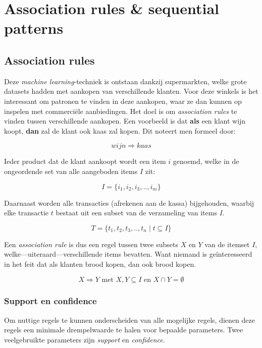 \chapter{Association rules \& sequential patterns}
%
\section{Association rules}
Deze \emph{machine learning}-techniek is ontstaan dankzij supermarkten, welke grote datasets hadden met aankopen van verschillende klanten. Voor deze winkels is het interessant om patronen te vinden in deze aankopen, waar ze dan kunnen op inspelen met commerci\"ele aanbiedingen. Het doel is om \emph{association rules} te vinden tussen verschillende aankopen. Een voorbeeld is dat \textbf{als} een klant wijn koopt, \textbf{dan} zal de klant ook kaas zal kopen. Dit noteert men formeel door:

\begin{equation}
wijn \Rightarrow kaas
\end{equation}

Ieder product dat de klant aankoopt wordt een item $i$ genoemd, welke in de ongeordende set van alle aangeboden items $I$ zit:

\begin{equation}
I = \{i_1, i_2, i_3, .., i_m\}
\end{equation}

Daarnaast worden alle transacties (afrekenen aan de kassa) bijgehouden, waarbij elke transactie $t$ bestaat uit een subset van de verzameling van items $I$.

\begin{equation}
T = \{t_1, t_2, t_3, .., t_n \mid t \subseteq I \}
\end{equation}

Een \emph{association rule} is dus een regel tussen twee subsets $X$ en $Y$ van de itemset $I$, welke---uiteraard---verschillende items bevatten. Want niemand is ge\"interesseerd in het feit dat als klanten brood kopen, dan ook brood kopen. 

\begin{equation}
X \Rightarrow Y \textrm{ met } X, Y \subseteq I \textrm{ en } X \cap Y = \emptyset
\end{equation}
%
\subsection{Support en confidence}
Om nuttige regels te kunnen onderscheiden van alle mogelijke regels, dienen deze regels een minimale drempelwaarde te halen voor bepaalde parameters. Twee veelgebruikte parameters zijn \emph{support} en \emph{confidence}. 
%
